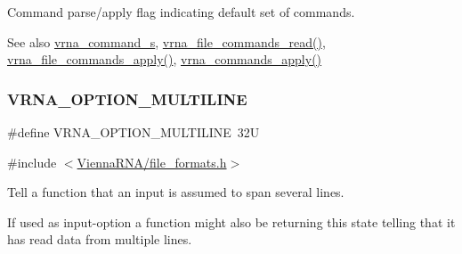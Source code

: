 Command parse/apply flag indicating default set of commands. 

\begin{DoxySeeAlso}{See also}
\hyperlink{group__file__utils_structvrna__command__s}{vrna\+\_\+command\+\_\+s}, \hyperlink{group__file__utils_ga5d2a64331cff5b1059e7d327545d8a63}{vrna\+\_\+file\+\_\+commands\+\_\+read()}, \hyperlink{group__file__utils_gadbe8c9622f7bcc6dcbe3448b98df8656}{vrna\+\_\+file\+\_\+commands\+\_\+apply()}, \hyperlink{group__file__utils_ga5e993fc4b9602af73aaaab4d3b3cd9a9}{vrna\+\_\+commands\+\_\+apply()} 
\end{DoxySeeAlso}
\mbox{\label{group__file__utils_gabec89c09874528c6cb73140a4c3d86d7}} 
\subsubsection{\texorpdfstring{V\+R\+N\+A\+\_\+\+O\+P\+T\+I\+O\+N\+\_\+\+M\+U\+L\+T\+I\+L\+I\+NE}{VRNA\_OPTION\_MULTILINE}}
{\footnotesize\ttfamily \#define V\+R\+N\+A\+\_\+\+O\+P\+T\+I\+O\+N\+\_\+\+M\+U\+L\+T\+I\+L\+I\+NE~32U}



{\ttfamily \#include $<$\hyperlink{file__formats_8h}{Vienna\+R\+N\+A/file\+\_\+formats.\+h}$>$}



Tell a function that an input is assumed to span several lines. 

If used as input-\/option a function might also be returning this state telling that it has read data from multiple lines.

